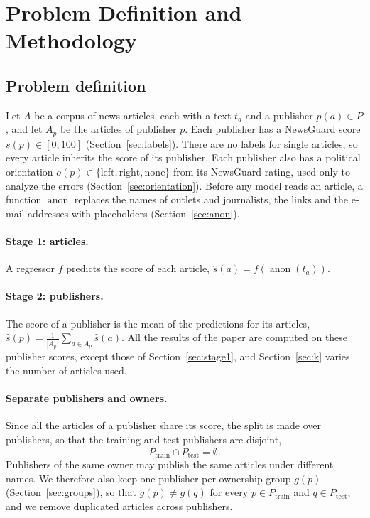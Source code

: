 \documentclass[11pt,a4paper]{article}
\newcommand{\anon}{\operatorname{anon}}
\begin{document}
\section{Problem Definition and Methodology}\label{sec:problem}

\subsection{Problem definition}\label{sec:definition}
Let $A$ be a corpus of news articles, each with a text $t_a$ and a publisher $p(a) \in P$, and let $A_p$ be the articles
of publisher $p$. Each publisher has a NewsGuard score $s(p) \in [0, 100]$ (Section~\ref{sec:labels}). There are no
labels for single articles, so every article inherits the score of its publisher. Each publisher also has a political
orientation $o(p) \in \{\text{left}, \text{right}, \text{none}\}$ from its NewsGuard rating, used only to analyze the
errors (Section~\ref{sec:orientation}). Before any model reads an article, a function $\anon$ replaces the names of
outlets and journalists, the links and the e-mail addresses with placeholders (Section~\ref{sec:anon}).

\paragraph{Stage 1: articles.} A regressor $f$ predicts the score of each article, $\hat{s}(a) = f(\anon(t_a))$.

\paragraph{Stage 2: publishers.} The score of a publisher is the mean of the predictions for its articles,
$\hat{s}(p) = \frac{1}{|A_p|} \sum_{a \in A_p} \hat{s}(a)$. All the results of the paper are computed on these
publisher scores, except those of Section~\ref{sec:stage1}, and Section~\ref{sec:k} varies the number of articles used.

\paragraph{Separate publishers and owners.} Since all the articles of a publisher share its score, the split is made over
publishers, so that the training and test publishers are disjoint,
\begin{equation}\label{eq:disjoint}
P_{\text{train}} \cap P_{\text{test}} = \emptyset .
\end{equation}
Publishers of the same owner may publish the same articles under different names. We therefore also keep one publisher
per ownership group $g(p)$ (Section~\ref{sec:groups}), so that $g(p) \neq g(q)$ for every $p \in P_{\text{train}}$ and
$q \in P_{\text{test}}$, and we remove duplicated articles across publishers.
\end{document}
